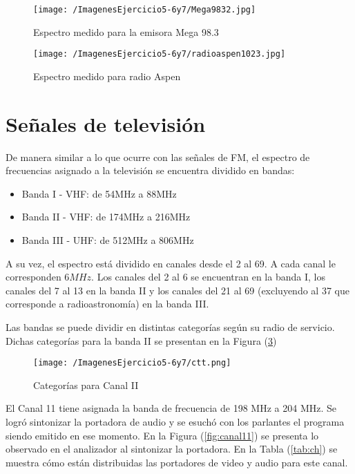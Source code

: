 \begin{figure}[H]
	\centering
	\texttt{[image: /ImagenesEjercicio5-6y7/Mega9832.jpg]}
\caption{Espectro medido para la emisora Mega 98.3}
	\label{fig:mega}
\end{figure}

\begin{figure}[H]
	\centering
	\texttt{[image: /ImagenesEjercicio5-6y7/radioaspen1023.jpg]}
\caption{Espectro medido para radio Aspen}
	\label{fig:aspen}
\end{figure}

\section{Señales de televisión}

De manera similar a lo que ocurre con las señales de FM, el espectro de frecuencias asignado a la televisión se encuentra dividido en bandas:
\begin{itemize}
    \item Banda I - VHF: de 54MHz a 88MHz 
    \item Banda II - VHF: de 174MHz a 216MHz 
    \item Banda III - UHF: de 512MHz a 806MHz
\end{itemize}

A su vez, el espectro está dividido en canales desde el 2 al 69. A cada canal le corresponden $6 MHz$. Los canales del 2 al 6 se encuentran en la banda I, los canales del 7 al 13 en la banda II y los canales del 21 al 69 (excluyendo al 37 que corresponde a radioastronomía) en la banda III.

Las bandas se puede dividir en distintas categorías según su radio de servicio. Dichas categorías para la banda II se presentan en la Figura (\ref{fig:ctt})

\begin{figure}[H]
	\centering
	\texttt{[image: /ImagenesEjercicio5-6y7/ctt.png]}
	\caption{Categorías para Canal II}	
	\label{fig:ctt}
\end{figure}

El Canal 11 tiene asignada la banda de frecuencia de 198 MHz a 204 MHz. Se logró sintonizar la portadora de audio y se esuchó con los parlantes el programa siendo emitido en ese momento. En la Figura (\ref{fig:canal11}) se presenta lo observado en el analizador al sintonizar la portadora. En la Tabla 
(\ref{tab:ch}) se muestra cómo están distribuidas las portadores de video y audio para este canal.

